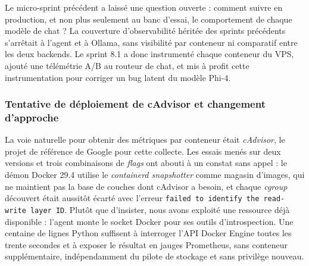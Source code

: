         Le micro-sprint précédent a laissé une question ouverte : comment suivre en
        production, et non plus seulement au banc d'essai, le comportement de chaque
        modèle de chat ? La couverture d'observabilité héritée des sprints précédents
        s'arrêtait à l'agent et à Ollama, sans visibilité par conteneur ni comparatif
        entre les deux backends. Le sprint 8.1 a donc instrumenté chaque conteneur du
        VPS, ajouté une télémétrie A/B au routeur de chat, et mis à profit cette
        instrumentation pour corriger un bug latent du modèle Phi-4.

        \subsubsection{Tentative de déploiement de cAdvisor et changement d'approche}

        La voie naturelle pour obtenir des métriques par conteneur était
        \textit{cAdvisor}, le projet de référence de Google pour cette collecte. Les
        essais menés sur deux versions et trois combinaisons de \textit{flags} ont
        abouti à un constat sans appel : le démon Docker 29.4 utilise le
        \textit{containerd snapshotter} comme magasin d'images, qui ne maintient pas
        la base de couches dont cAdvisor a besoin, et chaque \textit{cgroup}
        découvert était aussitôt écarté avec l'erreur \texttt{failed to identify the
        read-write layer ID}. Plutôt que d'insister, nous avons exploité une
        ressource déjà disponible : l'agent monte le socket Docker pour ses outils
        d'introspection. Une centaine de lignes Python suffisent à interroger l'API
        Docker Engine toutes les trente secondes et à exposer le résultat en jauges
        Prometheus, sans conteneur supplémentaire, indépendamment du pilote de
        stockage et sans privilège nouveau.

